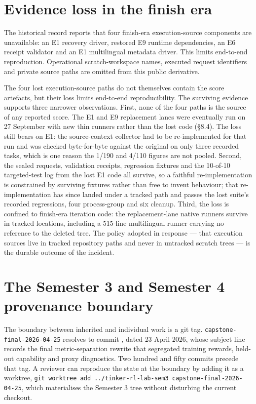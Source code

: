 \documentclass[12pt,a4paper]{report}
\DeclareRobustCommand{\longtok}[1]{\texttt{\seqsplit{#1}}}
\begin{document}
\section{Evidence loss in the finish
era}\label{evidence-loss-in-the-finish-era}

The historical record reports that four finish-era execution-source
components are unavailable: an E1 recovery driver, restored E9 runtime
dependencies, an E6 receipt validator and an E1 multilingual metadata
driver. This limits end-to-end reproduction. Operational
scratch-workspace names, executed request identifiers and private source
paths are omitted from this public derivative.

The four lost execution-source paths do not themselves contain the score
artefacts, but their loss limits end-to-end reproducibility. The
surviving evidence supports three narrower observations. First, none of
the four paths is the source of any reported score. The E1 and E9
replacement lanes were eventually run on 27 September with new thin
runners rather than the lost code (§8.4). The loss still bears on E1:
the source-context collector had to be re-implemented for that run and
was checked byte-for-byte against the original on only three recorded
tasks, which is one reason the 1/190 and 4/110 figures are not pooled.
Second, the sealed requests, validation receipts, regression fixtures
and the 10-of-10 targeted-test log from the lost E1 code all survive, so
a faithful re-implementation is constrained by surviving fixtures rather
than free to invent behaviour; that re-implementation has since landed
under a tracked path and passes the lost suite's recorded regressions,
four process-group and six cleanup. Third, the loss is confined to
finish-era iteration code: the replacement-lane native runners survive
in tracked locations, including a 515-line multilingual runner carrying
no reference to the deleted tree. The policy adopted in response ---
that execution sources live in tracked repository paths and never in
untracked scratch trees --- is the durable outcome of the incident.

\section{The Semester 3 and Semester 4 provenance
boundary}\label{the-semester-3-and-semester-4-provenance-boundary}

The boundary between inherited and individual work is a git tag.
\texttt{capstone-final-2026-04-25} resolves to commit
\longtok{21a99ef766543a1ca86bfbad188445d3596ea73c}, dated 23 April 2026,
whose subject line records the final metric-separation rewrite that
segregated training rewards, held-out capability and proxy diagnostics.
Two hundred and fifty commits precede that tag. A reviewer can reproduce
the state at the boundary by adding it as a worktree,
\texttt{git\ worktree\ add\ ../tinker-rl-lab-sem3\ capstone-final-2026-04-25},
which materialises the Semester 3 tree without disturbing the current
checkout.
\end{document}
